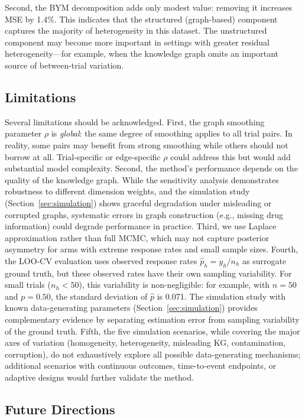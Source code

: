 \documentclass[12pt]{article}
\begin{document}
Second, the BYM decomposition adds only modest value: removing it increases MSE by 1.4\%. This indicates that the structured (graph-based) component captures the majority of heterogeneity in this dataset. The unstructured component may become more important in settings with greater residual heterogeneity---for example, when the knowledge graph omits an important source of between-trial variation.

\subsection{Limitations}
\label{sec:limitations}

Several limitations should be acknowledged. First, the graph smoothing parameter $\rho$ is \emph{global}: the same degree of smoothing applies to all trial pairs. In reality, some pairs may benefit from strong smoothing while others should not borrow at all. Trial-specific or edge-specific $\rho$ could address this but would add substantial model complexity. Second, the method's performance depends on the quality of the knowledge graph. While the sensitivity analysis demonstrates robustness to different dimension weights, and the simulation study (Section~\ref{sec:simulation}) shows graceful degradation under misleading or corrupted graphs, systematic errors in graph construction (e.g., missing drug information) could degrade performance in practice. Third, we use Laplace approximation rather than full MCMC, which may not capture posterior asymmetry for arms with extreme response rates and small sample sizes. Fourth, the LOO-CV evaluation uses observed response rates $\hat{p}_h = y_h / n_h$ as surrogate ground truth, but these observed rates have their own sampling variability. For small trials ($n_h < 50$), this variability is non-negligible: for example, with $n = 50$ and $p = 0.50$, the standard deviation of $\hat{p}$ is 0.071. The simulation study with known data-generating parameters (Section~\ref{sec:simulation}) provides complementary evidence by separating estimation error from sampling variability of the ground truth. Fifth, the five simulation scenarios, while covering the major axes of variation (homogeneity, heterogeneity, misleading KG, contamination, corruption), do not exhaustively explore all possible data-generating mechanisms; additional scenarios with continuous outcomes, time-to-event endpoints, or adaptive designs would further validate the method.

\subsection{Future Directions}
\label{sec:future}
\end{document}
